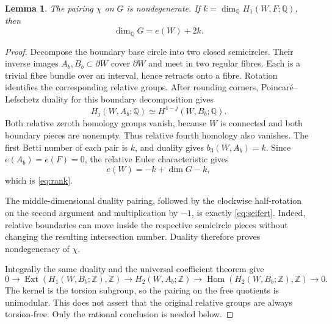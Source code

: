 \documentclass[11pt]{article}
\newtheorem{lemma}[theorem]{Lemma}
\theoremstyle{definition}
\theoremstyle{remark}
\newcommand{\Z}{\mathbb Z}
\newcommand{\Q}{\mathbb Q}
\newcommand{\Hom}{\operatorname{Hom}}
\newcommand{\Ext}{\operatorname{Ext}}
\begin{document}
\begin{lemma}\label{lem:duality}
The pairing $\chi$ on $G$ is nondegenerate. If $k=\dim_{\Q}H_1(W,F;\Q)$, then
\begin{equation}\label{eq:rank}
\dim_{\Q}G=e(W)+2k.
\end{equation}
\end{lemma}
\begin{proof}
Decompose the boundary base circle into two closed semicircles. Their inverse images $A_b,B_b\subset\partial W$ cover $\partial W$ and meet in two regular fibres. Each is a trivial fibre bundle over an interval, hence retracts onto a fibre. Rotation identifies the corresponding relative groups. After rounding corners, Poincar\'e--Lefschetz duality for this boundary decomposition gives
\[
H_j(W,A_b;\Q)\simeq H^{4-j}(W,B_b;\Q).
\]
Both relative zeroth homology groups vanish, because $W$ is connected and both boundary pieces are nonempty. Thus relative fourth homology also vanishes. The first Betti number of each pair is $k$, and duality gives $b_3(W,A_b)=k$. Since $e(A_b)=e(F)=0$, the relative Euler characteristic gives
\[
e(W)=-k+\dim G-k,
\]
which is \eqref{eq:rank}.

The middle-dimensional duality pairing, followed by the clockwise half-rotation on the second argument and multiplication by $-1$, is exactly \eqref{eq:seifert}. Indeed, relative boundaries can move inside the respective semicircle pieces without changing the resulting intersection number. Duality therefore proves nondegeneracy of $\chi$.

Integrally the same duality and the universal coefficient theorem give
\[
0\longrightarrow\Ext(H_1(W,B_b;\Z),\Z)
\longrightarrow H_2(W,A_b;\Z)
\longrightarrow\Hom(H_2(W,B_b;\Z),\Z)\longrightarrow0.
\]
The kernel is the torsion subgroup, so the pairing on the free quotients is unimodular. This does not assert that the original relative groups are always torsion-free. Only the rational conclusion is needed below.
\end{proof}
\end{document}
